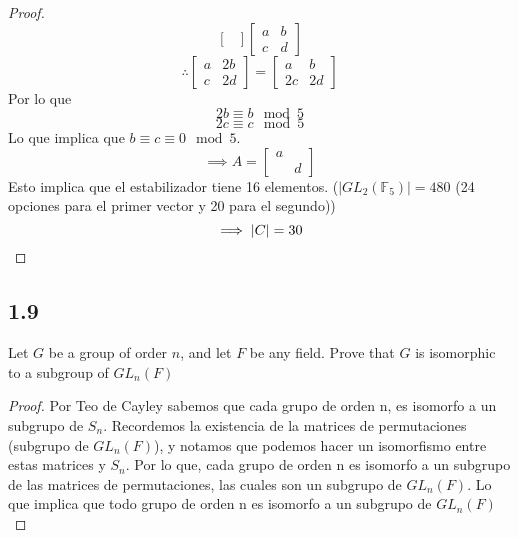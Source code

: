 \documentclass[11pt]{article}
\newcommand{\set}[1]{\mathbb{#1}}
\theoremstyle{definition}
\begin{document}
\begin{proof}
\[\begin{bmatrix}
            \end{bmatrix}\begin{bmatrix}
                a & b \\
                c & d
            \end{bmatrix}\]
            \[\therefore\begin{bmatrix}
                a & 2b \\
                c & 2d
            \end{bmatrix}=\begin{bmatrix}
                a & b \\
                2c & 2d
            \end{bmatrix}\]
            Por lo que
            \[2b\equiv b\mod 5\]
            \[2c\equiv c\mod 5\]
            Lo que implica que $b\equiv c\equiv 0\mod 5$.
            \[\implies A=\begin{bmatrix}
                a &   \\
                  & d
            \end{bmatrix}\]
            Esto implica que el estabilizador tiene 16 elementos. ($|GL_2(\set{F}_5)|=480$ (24 opciones para el primer vector y 20 para el segundo))
            \[\implies |C|=30\qedhere\]
        \end{proof}
        \subsection{1.9}
        Let $G$ be a group of order $n$, and let $F$ be any field. Prove that $G$ is isomorphic to a subgroup of $GL_n(F)$
        \begin{proof}
            Por Teo de Cayley sabemos que cada grupo de orden n, es isomorfo a un subgrupo de $S_n$. Recordemos la existencia de la matrices de permutaciones (subgrupo de $GL_n(F)$), y notamos que podemos hacer un isomorfismo entre estas matrices y $S_n$. Por lo que, cada grupo de orden n es isomorfo a un subgrupo de las matrices de permutaciones, las cuales son un subgrupo de $GL_n(F)$. Lo que implica que todo grupo de orden n es isomorfo a un subgrupo de $GL_n(F)$
        \end{proof}
\end{document}
